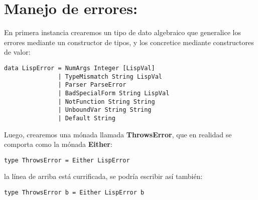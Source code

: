 \section{Manejo de errores:}
\label{3:sec3}

En primera instancia crearemos un tipo de dato algebraico que generalice los errores mediante un constructor de tipos, y los concretice mediante constructores de valor:\\

\begin{minipage}{\linewidth}
\begin{footnotesize}
\begin{lstlisting}[frame=single]
data LispError = NumArgs Integer [LispVal]
               | TypeMismatch String LispVal
               | Parser ParseError
               | BadSpecialForm String LispVal
               | NotFunction String String
               | UnboundVar String String
               | Default String
\end{lstlisting}
\end{footnotesize}
\end{minipage}

Luego, crearemos una m\'onada llamada \textbf{ThrowsError}, que en realidad se comporta como la m\'onada \textbf{Either}:\\

\begin{minipage}{\linewidth}
\begin{footnotesize}
\begin{lstlisting}[frame=single]
type ThrowsError = Either LispError
\end{lstlisting}
\end{footnotesize}
\end{minipage}

la l\'inea de arriba est\'a currificada, se podr\'ia escribir as\'i tambi\'en:\\

\begin{minipage}{\linewidth}
\begin{footnotesize}
\begin{lstlisting}[frame=single]
type ThrowsError b = Either LispError b
\end{lstlisting}
\end{footnotesize}
\end{minipage}

